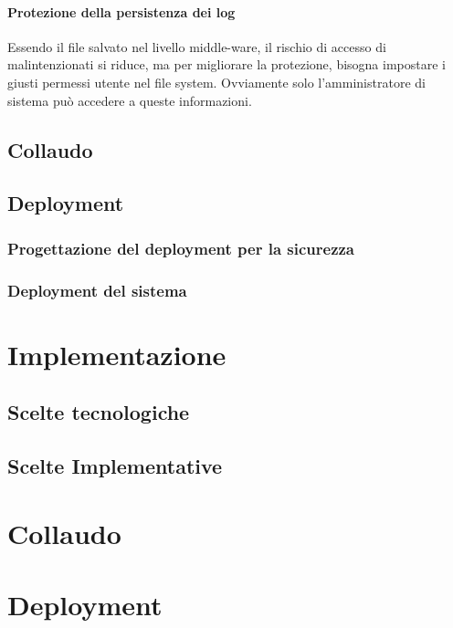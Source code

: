 \documentclass[a4paper]{article}
\begin{document}
\paragraph{Protezione della persistenza dei log} Essendo il file salvato nel livello middle-ware, il rischio di accesso di malintenzionati si riduce, ma per migliorare la protezione, bisogna impostare i giusti permessi utente nel file system. Ovviamente solo l'amministratore di sistema può accedere a queste informazioni.

\newpage

\subsection{Collaudo}

\subsection{Deployment}
\subsubsection{Progettazione del deployment per la sicurezza}
\subsubsection{Deployment del sistema}

\section{Implementazione}

\subsection{Scelte tecnologiche}

\subsection{Scelte Implementative}

\section{Collaudo}

\section{Deployment}
\end{document}
